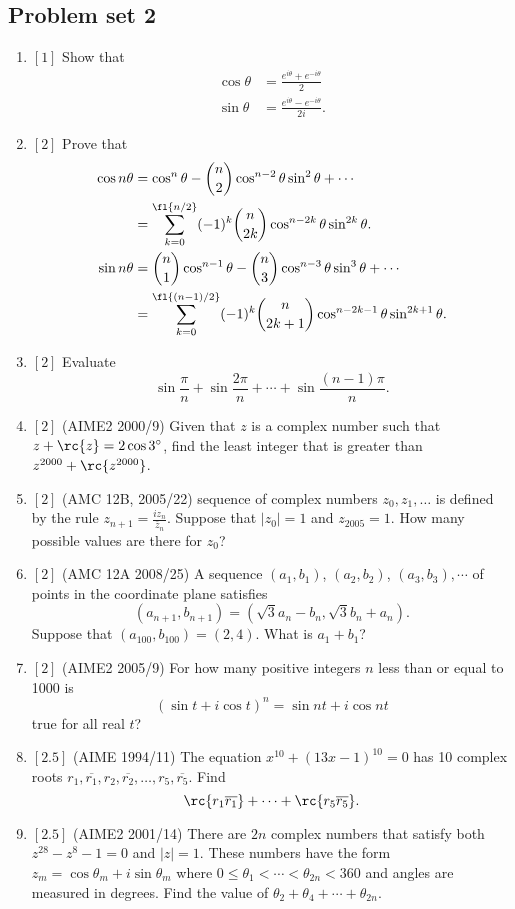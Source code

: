 \subsection{Problem set 2}
\begin{enumerate}
\item $[1]$ Show that
\begin{align*}
\cos\theta&=\frac{e^{i\theta}+e^{-i\theta}}{2}\\
\sin\theta&=\frac{e^{i\theta}-e^{-i\theta}}{2i}.
\end{align*}
\item $[2]$ Prove that
\begin{align*}
\cos n\theta&=
\cos^n\theta-\binom n2\cos^{n-2}\theta \sin^2\theta+\cdots\\
&=\sum_{k=0}^{\fl{n/2}} (-1)^k\binom{n}{2k}\cos^{n-2k}\theta\sin^{2k}\theta.\\
\sin n\theta&=
\binom n1\cos^{n-1}\theta-\binom n3\cos^{n-3}\theta \sin^3\theta+\cdots\\
&=\sum_{k=0}^{\fl{(n-1)/2}} (-1)^k\binom{n}{2k+1}\cos^{n-2k-1}\theta\sin^{2k+1}\theta.
\end{align*}
\item $[2]$ Evaluate
\[
\sin \frac{\pi}{n}+\sin\frac{2\pi }{n}+\cdots +\sin\frac{(n-1)\pi}{n}. 
\]
\item $[2]$ (AIME2 2000/9) Given that $z$ is a complex number such that $z+\rc{z}=2\cos 3^{\circ}$, find the least integer that is greater than $z^{2000}+\rc{z^{2000}}$.
\item $[2]$ (AMC 12B, 2005/22) sequence of complex numbers $z_0,z_1,\ldots$ is defined by the rule $z_{n+1}=\frac{iz_n}{\bar z_n}$. Suppose that $|z_0|=1$ and $z_{2005}=1$. How many possible values are there for $z_0$?
\item $[2]$ (AMC 12A 2008/25) A sequence $(a_1,b_1)$, $(a_2,b_2)$, $(a_3,b_3),\cdots$ of points in the coordinate plane satisfies
\[(a_{n+1},b_{n+1})=(\sqrt3 a_n-b_n,\sqrt 3 b_n+a_n).\]
Suppose that $(a_{100},b_{100})=(2,4)$. What is $a_1+b_1$?
\item $[2]$ (AIME2 2005/9) For how many positive integers $n$ less than or equal to 1000 is
\[
(\sin t+i\cos t)^n=\sin nt+i\cos nt
\]
true for all real $t$?
\item $[2.5]$ (AIME 1994/11) The equation $x^{10}+(13x-1)^{10}=0$ has 10 complex roots $r_1,\overline{r_1}, r_2,\overline{r_2},\ldots, r_5,\overline{r_5}$. Find
\[
\rc{r_1\overline{r_1}}+\cdots +\rc{r_5\overline{r_5}}.
\]
\item $[2.5]$ (AIME2 2001/14) There are $2n$ complex numbers that satisfy both $z^{28}-z^8-1=0$ and $|z|=1$. These numbers have the form $z_m=\cos \theta_m+i\sin\theta_m$ where $0\leq \theta_1< \cdots < \theta_{2n}<360$ and angles are measured in degrees. Find the value of $\theta_2+\theta_4+\cdots +\theta_{2n}$.

\end{enumerate}
